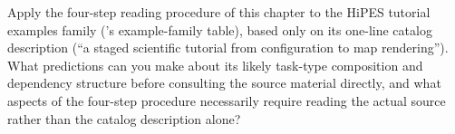 \begin{exercise}
Apply the four-step reading procedure of this chapter to the HiPES tutorial
examples family ('s example-family table), based
only on its one-line catalog description (``a staged scientific tutorial
from configuration to map rendering''). What predictions can you make about
its likely task-type composition and dependency structure before consulting
the source material directly, and what aspects of the four-step procedure
necessarily require reading the actual source rather than the catalog
description alone?
\end{exercise}
